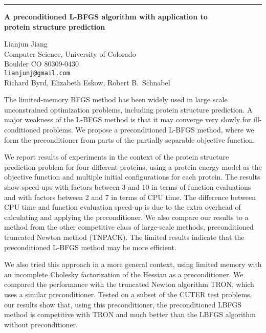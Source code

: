 \documentclass[twosided]{report}
\begin{document}
	\begin{center} \rule{6in}{1pt} \end{center}

\begin{center}
{\large			%
{\bf A preconditioned L-BFGS algorithm with application to \\
	protein structure prediction}}

	Lianjun Jiang \\
	Computer Science, University of Colorado \\
	Boulder CO 80309-0430 \\
	{\tt lianjunj@gmail.com} \\
	Richard Byrd, Elizabeth Eskow, Robert B.~Schnabel
\end{center}
The limited-memory BFGS method has been widely used in large
scale unconstrained optimization problems, including protein
structure prediction. A major weakness of the L-BFGS method
is that it may converge very slowly for ill-conditioned
problems. We propose a preconditioned L-BFGS method, where
we form the preconditioner from parts of the partially
separable objective function.

We report results of
experiments in the context of the protein structure
prediction problem for four different proteins, using a
protein energy model as the objective function and multiple
initial configurations for each protein. The results show
speed-ups with factors between 3 and 10 in terms of function
evaluations and with factors between 2 and 7 in terms of CPU
time. The difference between CPU time and function
evaluation speed-up is due to the extra overhead of
calculating and applying the preconditioner. We also compare
our results to a method from the other competitive class of
large-scale methods, preconditioned truncated Newton method
(TNPACK). The limited results indicate that the
preconditioned L-BFGS method may be more efficient.

We
also tried this approach in a more general context, using
limited memory with an incomplete Cholesky factorization of
the Hessian as a preconditioner. We compared the performance
with the truncated Newton algorithm TRON, which uses a
similar preconditioner. Tested on a subset of the CUTER test
problems, our results show that, using this preconditioner,
the preconditioned LBFGS method is competitive with TRON and
much better than the LBFGS algorithm without preconditioner.
\end{document}
